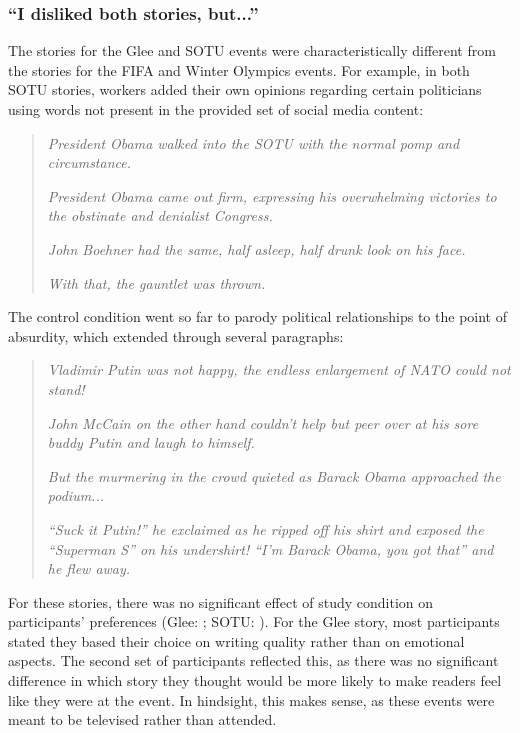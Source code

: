 \subsubsection{``I disliked both stories, but...''}
The stories for the Glee and SOTU events were characteristically different from the stories for the FIFA and Winter Olympics events. For example, in both SOTU stories, workers added their own opinions regarding certain politicians using words not present in the provided set of social media content:

\begin{quote}
\emph{President Obama walked into the SOTU with the normal pomp and circumstance.}

\emph{President Obama came out firm, expressing his overwhelming victories to the obstinate and denialist Congress.}

\emph{John Boehner had the same, half asleep, half drunk look on his face.}

\emph{With that, the gauntlet was thrown.}

\end{quote}

The control condition went so far to parody political relationships to the point of absurdity, which extended through several paragraphs:

\begin{quote}
\emph{Vladimir Putin was not happy, the endless enlargement of NATO could not stand!}

\emph{John McCain on the other hand couldn't help but peer over at his sore buddy Putin and laugh to himself.}

\emph{But the murmering in the crowd quieted as Barack Obama approached the podium...}

\emph{``Suck it Putin!'' he exclaimed as he ripped off his shirt and exposed the ``Superman S'' on his undershirt! ``I'm Barack Obama, you got that'' and he flew away.}

\end{quote}

For these stories, there was no significant effect of study condition on participants' preferences (Glee: ; SOTU: ). For the Glee story, most participants stated they based their choice on writing quality rather than on emotional aspects. The second set of participants reflected this, as there was no significant difference in which story they thought would be more likely to make readers feel like they were at the event. In hindsight, this makes sense, as these events were meant to be televised rather than attended.


